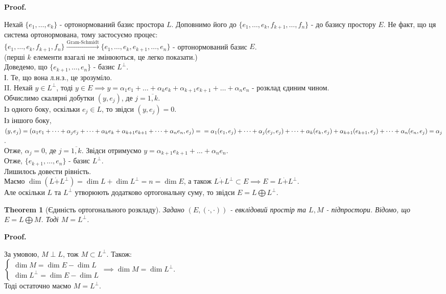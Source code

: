 \documentclass[a4paper, 10pt]{article}
\makeatletter
\def\qed{$\blacksquare$}
\theoremstyle{theoremdd}
\newtheorem{theorem}{Theorem}[subsection]
\theoremstyle{theoremdd}
\theoremstyle{theoremdd}
\theoremstyle{theoremdd}
\theoremstyle{theoremdd}
\theoremstyle{theoremdd}
\theoremstyle{theoremdd}
\theoremstyle{theoremdd}
\renewenvironment{proof}[1][Proof.\\]{\par
\pushQED{\hfill \qed}%
\normalfont \topsep6\p@\@plus6\p@\relax
\trivlist
\item\relax
{\bfseries
#1\@addpunct{.}}\hspace\labelsep\ignorespaces
}{%
\popQED\endtrivlist\@endpefalse
}
\makeatother
\begin{document}
\begin{proof}
Нехай $\{e_1,\dots,e_k\}$ - ортонормований базис простора $L$. Доповнимо його до $\{e_1,\dots,e_k,f_{k+1},\dots,f_n\}$ - до базису простору $E$. Не факт, що ця система ортонормована, тому застосуємо процес:\\
$\{e_1,\dots,e_k,f_{k+1},f_n\} \overset{\textrm{Gram-Schmidt}}{\longrightarrow} \{e_1,\dots,e_k, e_{k+1},\dots,e_n\}$ - ортонормований базис $E$.\\
(перші $k$ елементи взагалі не змінюються, це легко показати.)\\
Доведемо, що $\{e_{k+1},\dots, e_n\}$ - базис $L^\perp$.\\
І. Те, що вона л.н.з., це зрозуміло.\\
II. Нехай $y \in L^\perp$, тоді $y \in E \implies y = \alpha_1 e_1 + \dots + \alpha_k e_k + \alpha_{k+1} e_{k+1} + \dots + \alpha_n e_n$ - розклад єдиним чином.\\
Обчислимо скалярні добутки $(y,e_j)$, де $j=\overline{1,k}$.\\
Із одного боку, оскільки $e_j \in L$, то звідси $(y,e_j) = 0$.\\
Із іншого боку, $(y,e_j) = (\alpha_1 e_1 + \dots + \alpha_j e_j + \dots + \alpha_k e_k + \alpha_{k+1} e_{k+1} + \dots + \alpha_n e_n, e_j) = \\
= \alpha_1 (e_1,e_j) + \dots + \alpha_j (e_j,e_j) + \dots + \alpha_k (e_k,e_j) + \alpha_{k+1} (e_{k+1},e_j) + \dots + \alpha_n (e_n,e_j) = \alpha_j$.\\
Отже, $\alpha_j = 0$, де $j=\overline{1,k}$. Звідси отримуємо $y = \alpha_{k+1} e_{k+1} + \dots + \alpha_n e_n$.\\
Отже, $\{e_{k+1},\dots, e_n\}$ - базис $L^\perp$.\\
Лишилось довести рівність. \\
Маємо $\dim (L \dot{+} L^\perp) = \dim L + \dim L^\perp = n = \dim E$, а також $L\dot{+}L^\perp \subset E \implies E = L \dot{+} L^\perp$.\\
Але оскільки $L$ та $L^\perp$ утворюють додатково ортогональну суму, то звідси $E = L \bigoplus L^\perp$.
\end{proof}

\begin{theorem}[Єдиність ортогонального розкладу]
Задано $(E,(\cdot,\cdot))$ - евклідовий простір та $L,M$ - підпростори. Відомо, що $E = L \bigoplus M$. Тоді $M = L^\perp$.
\end{theorem}

\begin{proof}
За умовою, $M \perp L$, тож $M \subset L^{\perp}$. Також:\\
$\begin{cases}
\dim M = \dim E - \dim L \\
\dim L^{\perp} = \dim E - \dim L
\end{cases} \implies \dim M = \dim L^\perp$.\\
Тоді остаточно маємо $M = L^\perp$.
\end{proof}
\end{document}
